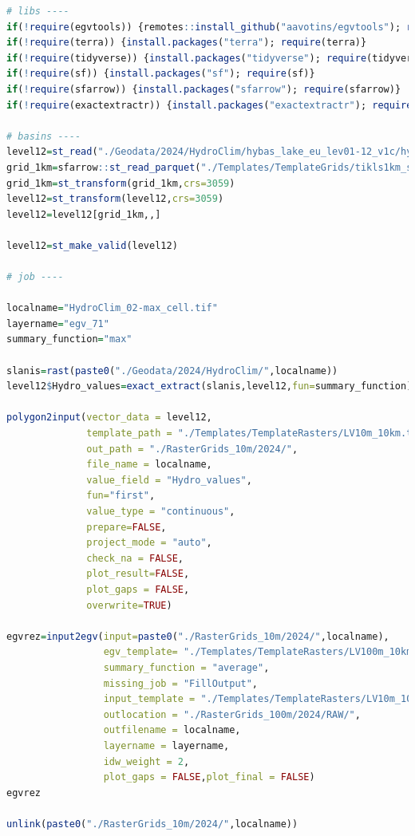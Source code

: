 \documentclass[
]{book}
\begin{document}
\begin{lstlisting}[language=R]
# libs ----
if(!require(egvtools)) {remotes::install_github("aavotins/egvtools"); require(egvtools)}
if(!require(terra)) {install.packages("terra"); require(terra)}
if(!require(tidyverse)) {install.packages("tidyverse"); require(tidyverse)}
if(!require(sf)) {install.packages("sf"); require(sf)}
if(!require(sfarrow)) {install.packages("sfarrow"); require(sfarrow)}
if(!require(exactextractr)) {install.packages("exactextractr"); require(exactextractr)}

# basins ----
level12=st_read("./Geodata/2024/HydroClim/hybas_lake_eu_lev01-12_v1c/hybas_lake_eu_lev12_v1c.shp")
grid_1km=sfarrow::st_read_parquet("./Templates/TemplateGrids/tikls1km_sauzeme.parquet")
grid_1km=st_transform(grid_1km,crs=3059)
level12=st_transform(level12,crs=3059)
level12=level12[grid_1km,,]

level12=st_make_valid(level12)

# job ----

localname="HydroClim_02-max_cell.tif"
layername="egv_71"
summary_function="max"
  
slanis=rast(paste0("./Geodata/2024/HydroClim/",localname))
level12$Hydro_values=exact_extract(slanis,level12,fun=summary_function)
  
polygon2input(vector_data = level12,
              template_path = "./Templates/TemplateRasters/LV10m_10km.tif",
              out_path = "./RasterGrids_10m/2024/",
              file_name = localname,
              value_field = "Hydro_values",
              fun="first",
              value_type = "continuous",
              prepare=FALSE,
              project_mode = "auto",
              check_na = FALSE,
              plot_result=FALSE,
              plot_gaps = FALSE,
              overwrite=TRUE)
  
egvrez=input2egv(input=paste0("./RasterGrids_10m/2024/",localname),
                 egv_template= "./Templates/TemplateRasters/LV100m_10km.tif",
                 summary_function = "average",
                 missing_job = "FillOutput",
                 input_template = "./Templates/TemplateRasters/LV10m_10km.tif",
                 outlocation = "./RasterGrids_100m/2024/RAW/",
                 outfilename = localname,
                 layername = layername,
                 idw_weight = 2,
                 plot_gaps = FALSE,plot_final = FALSE)
egvrez
  
unlink(paste0("./RasterGrids_10m/2024/",localname))
\end{lstlisting}
\end{document}
